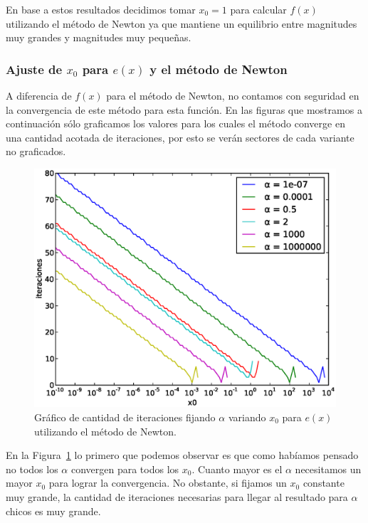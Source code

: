 En base a estos resultados decidimos tomar $x_0 = 1$ para calcular $f(x)$
utilizando el método de Newton ya que mantiene un equilibrio entre magnitudes
muy grandes y magnitudes muy pequeñas.

\subsubsection{Ajuste de $x_0$ para $e(x)$ y el método de Newton}
\label{ssub:ajuste_e_x0_newton}

A diferencia de $f(x)$ para el método de Newton, no contamos con seguridad en
la convergencia de este método para esta función. En las figuras que mostramos
a continuación sólo graficamos los valores para los cuales el método converge
en una cantidad acotada de iteraciones, por esto se verán sectores de cada
variante no graficados.

\begin{figure}[!htbp]
  \begin{center}
    \includegraphics[scale=0.5]{graficos/new/e_newton_x0_variable.eps}
    \caption{\label{fig:e_newton_x0_variable} Gráfico de cantidad de iteraciones fijando $\alpha$ variando $x_0$ para $e(x)$ utilizando el método de Newton.}
  \end{center}
\end{figure}

En la Figura~\ref{fig:e_newton_x0_variable} lo primero que podemos observar es que
como habíamos pensado no todos los $\alpha$ convergen para todos los $x_0$. Cuanto
mayor es el $\alpha$ necesitamos un mayor $x_0$ para lograr la convergencia. No
obstante, si fijamos un $x_0$ constante muy grande, la cantidad de iteraciones
necesarias para llegar al resultado para $\alpha$ chicos es muy grande.

